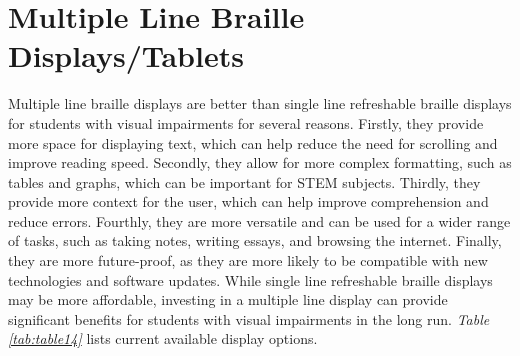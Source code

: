 \pagebreak
\hypertarget{multiple-line-refreshable-braille-displaystablets}{}\section{Multiple Line Braille Displays/Tablets}\label{multiple-line-refreshable-braille-displaystablets}
Multiple line braille displays are better than single line refreshable braille displays for students with visual impairments for several reasons. Firstly, they provide more space for displaying text, which can help reduce the need for scrolling and improve reading speed. Secondly, they allow for more complex formatting, such as tables and graphs, which can be important for STEM subjects. Thirdly, they provide more context for the user, which can help improve comprehension and reduce errors. Fourthly, they are more versatile and can be used for a wider range of tasks, such as taking notes, writing essays, and browsing the internet. Finally, they are more future-proof, as they are more likely to be compatible with new technologies and software updates. While single line refreshable braille displays may be more affordable, investing in a multiple line display can provide significant benefits for students with visual impairments in the long run. \textit{Table \ref{tab:table14}} lists current available display options.

